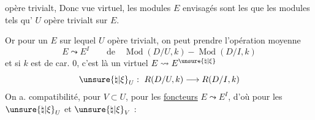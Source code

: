 opère trivialt,  Donc  vue virtuel,  les modules $E$ envisagés sont  les  que les modules tels qu' $U$ opère trivialt sur $E$.

Or pour un $E$ sur lequel $U$ opère trivialt, on peut prendre l'opération moyenne
\[
E\leadsto E^I\qquad\text{de}\quad \operatorname{Mod}(D/U,k)-\operatorname{Mod}(D/I,k)
\]
et si $k$ est de car. $0$, c'est là un    virtuel  $E\leadsto E^{\unsure{\natural|\xi}}$
\[
\unsure{\natural|\xi}_U:\ R(D/U,k)\longrightarrow R(D/I,k)
\]
On a. compatibilité, pour $V\subset U$, pour les \uline{foncteurs} $E\leadsto E^I$, d'où pour les $\unsure{\natural|\xi}_U$ et $\unsure{\natural|\xi}_V$ :


